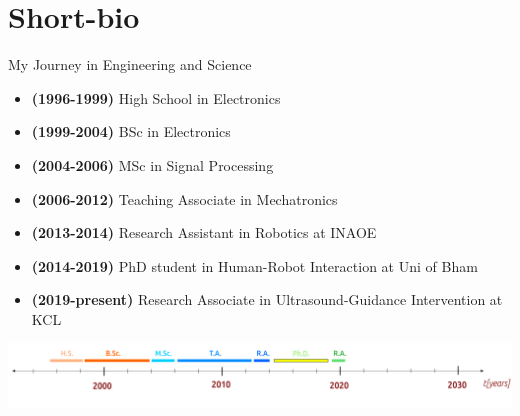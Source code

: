 \section{Short-bio}

\begin{frame}{My Journey in Engineering and Science}
\begin{itemize}	
	\item \textbf{(1996-1999)} High School in Electronics
	\item \textbf{(1999-2004)} BSc in Electronics  
	\item \textbf{(2004-2006)} MSc in Signal Processing 
	\item \textbf{(2006-2012)} Teaching Associate in Mechatronics 
	\item \textbf{(2013-2014)} Research Assistant in Robotics at INAOE  
	\item \textbf{(2014-2019)} PhD student in Human-Robot Interaction at Uni of Bham
	\item \textbf{(2019-present)} Research Associate in Ultrasound-Guidance Intervention at KCL
\end{itemize}
	\vspace{4mm}
    \includegraphics[width=\linewidth]{./figs/myjourney/versions/drawing.png}
\end{frame}